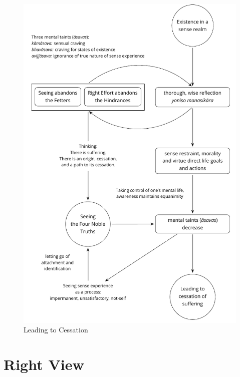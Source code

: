 \clearpage

\begin{figure}[h]
\vspace*{-10mm}%
\caption{Leading to Cessation}\label{fig-leading-to-cessation}

\centering

\includegraphics[width=\linewidth]{./manuscript/tex/diagrams/leading-to-cessation.pdf}

\end{figure}

\clearpage
\normalpagelayout

\section{Right View}

